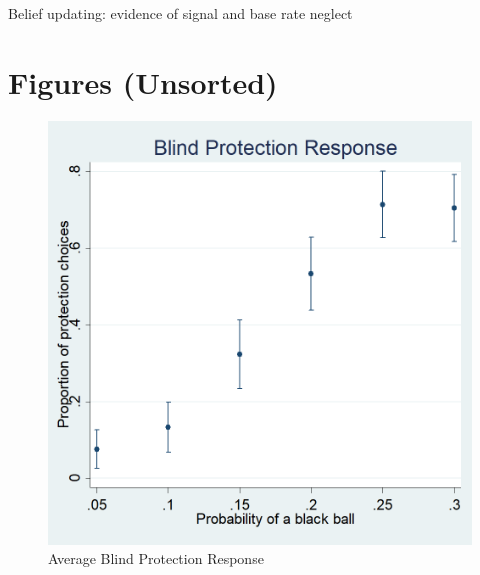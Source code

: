 \documentclass[11pt,a4paper]{article}
\begin{document}
%
%
\begin{table}
\caption{Belief updating: evidence of signal and base rate neglect}

\end{table}




%

%

%

%


%
\vspace{40pt}
\newpage

\newpage

\section{Figures (Unsorted)}

\begin{figure}[H]
\centering
\caption{Average Blind Protection Response} \label{Blind Protection Responses}

  \centering
  \includegraphics[scale=0.3]{Graphs/blind_prot_sta.png}

\end{figure}
\end{document}
